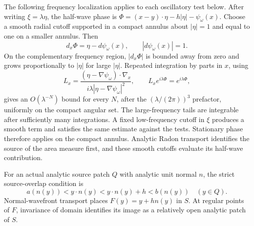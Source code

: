 \documentclass[11pt]{article}
\begin{document}
The following frequency localization applies to each oscillatory test below. After writing $\xi=\lambda\eta$, the half-wave phase is $\Phi=(x-y)\cdot\eta-h|\eta|-\psi_\omega(x)$. Choose a smooth radial cutoff supported in a compact annulus about $|\eta|=1$ and equal to one on a smaller annulus. Then
\[
 d_x\Phi=\eta-d\psi_\omega(x),\qquad |d\psi_\omega(x)|=1.
\]
On the complementary frequency region, $|d_x\Phi|$ is bounded away from zero and grows proportionally to $|\eta|$ for large $|\eta|$. Repeated integration by parts in $x$, using
\[
 L_x=\frac{(\eta-\nabla\psi_\omega)\cdot\nabla_x}
 {i\lambda|\eta-\nabla\psi_\omega|^2},\qquad
 L_xe^{i\lambda\Phi}=e^{i\lambda\Phi},
\]
gives an $O(\lambda^{-N})$ bound for every $N$, after the $(\lambda/(2\pi))^3$ prefactor, uniformly on the compact angular set. The large-frequency tails are integrable after sufficiently many integrations. A fixed low-frequency cutoff in $\xi$ produces a smooth term and satisfies the same estimate against the tests. Stationary phase therefore applies on the compact annulus. Analytic Radon transport identifies the source of the area measure first, and these smooth cutoffs evaluate its half-wave contribution.

For an actual analytic source patch $Q$ with analytic unit normal $n$, the strict source-overlap condition is
\begin{equation}\label{strictsourceoffset}
 a(n(y))<y\cdot n(y)<y\cdot n(y)+h<b(n(y))\quad(y\in Q).
\end{equation}
Normal-wavefront transport places $F(y)=y+hn(y)$ in $S$. At regular points of $F$, invariance of domain identifies its image as a relatively open analytic patch of $S$.
\end{document}
